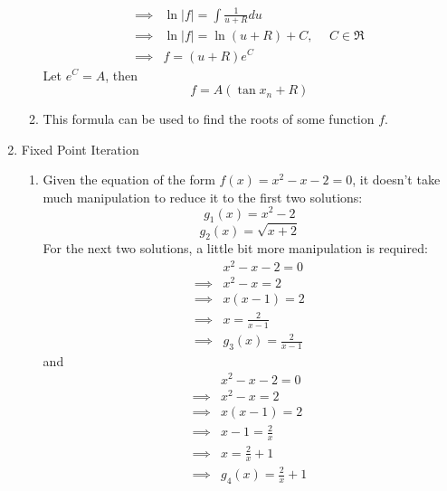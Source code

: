 \documentclass[12pt]{article}
\begin{document}
\begin{enumerate}
\begin{enumerate}
\begin{equation*}
\begin{split}
                    \implies &\ln|f| = \int\frac{1}{u + R}du \\
                    \implies &\ln|f| = \ln(u + R) + C, \hspace{15pt} C \in \Re \\
                    \implies &f = (u + R)e^C
                \end{split}
            \end{equation*}
            Let $e^C = A$, then 
            \begin{equation*}
                f = A(\tan x_n + R)
            \end{equation*}
            \item This formula can be used to find the roots of some function $f$.
        \end{enumerate}
        \item Fixed Point Iteration
        \begin{enumerate}
            \item Given the equation of the form $f(x)=x^2-x-2=0$, it doesn't take much manipulation to 
            reduce it to the first two solutions:
            \begin{equation*}
                g_1(x) = x^2-2
            \end{equation*}
            \begin{equation*}
                g_2(x) = \sqrt{x+2}
            \end{equation*}
            For the next two solutions, a little bit more manipulation is required:
            \begin{equation*}
                \begin{split}
                    &x^2-x-2=0 \\
                    \implies &x^2-x=2 \\
                    \implies &x(x-1)=2 \\
                    \implies &x=\frac{2}{x-1} \\
                    \implies &g_3(x) = \frac{2}{x-1}
                \end{split}
            \end{equation*}
            and
            \begin{equation*}
                \begin{split}
                    &x^2-x-2=0 \\
                    \implies &x^2-x=2 \\
                    \implies &x(x-1)=2 \\
                    \implies &x-1=\frac{2}{x} \\
                    \implies &x=\frac{2}{x}+1 \\
                    \implies &g_4(x)=\frac{2}{x}+1
                \end{split}
            \end{equation*}


\end{enumerate}
\end{enumerate}
\end{document}
